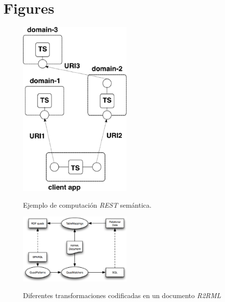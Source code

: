 \chapter{Figures}

\vspace*{-3in}

\begin{figure}
\vspace{2.4in}
\caption{Ejemplo de computaci\'on \textit{REST} sem\'antica.}
\includegraphics[width=0.5\textwidth]{figura1}
\label{figura1}
\end{figure}

\clearpage
\newpage

\vspace*{-3in}

\begin{figure}
\vspace{2.4in}
\caption{Diferentes transformaciones codificadas en un documento \textit{R2RML}}
\includegraphics[width=0.5\textwidth]{figura2}
\label{figura2}
\end{figure}

\clearpage
\newpage

